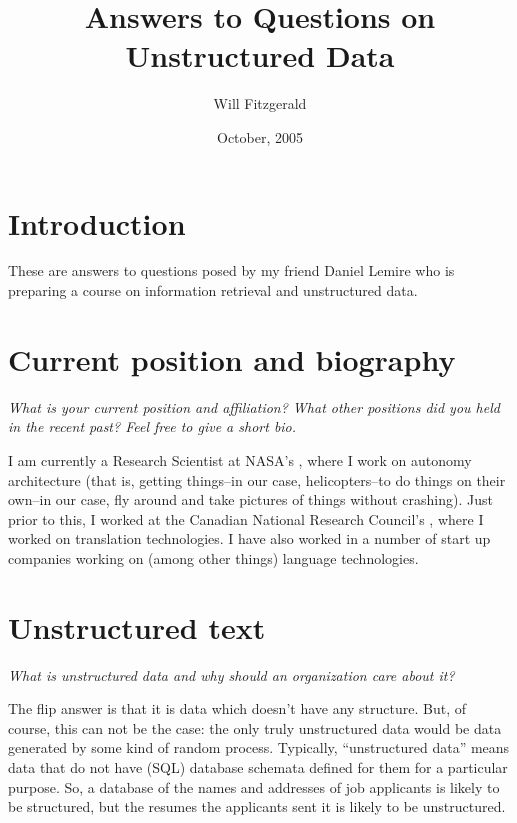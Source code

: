 \documentclass[11pt]{article}
\title{Answers to Questions on Unstructured Data}
\author{Will Fitzgerald}
\date{October, 2005}
\begin{document}
\maketitle

\section{Introduction}

These are answers to questions posed by my friend Daniel Lemire who is preparing a course on information retrieval and unstructured data.

\section{Current position and biography}

\textit{What is your current position and affiliation? What other positions
did you held in the recent past? Feel free to give a short bio.}

I am currently a Research Scientist at NASA's , where I work on autonomy architecture (that is, getting things--in our case, helicopters--to do things on their own--in our case, fly around and take pictures of things without crashing). Just prior to this, I worked at the Canadian National Research Council's , where I worked on translation technologies. I have also worked in a number of start up companies working on (among other things) language technologies.

\section{Unstructured text}
\textit{What is unstructured data and why should an organization care about it?}

The flip answer is that it is data which doesn't have any structure. But, of course, this can not be the case: the only truly unstructured data would be data generated by some kind of random process. Typically, ``unstructured data'' means data that do not have (SQL) database schemata defined for them for a particular purpose. So, a database of the names and addresses of job applicants is likely to be structured, but the resumes the applicants sent it is likely to be unstructured. 
\end{document}
